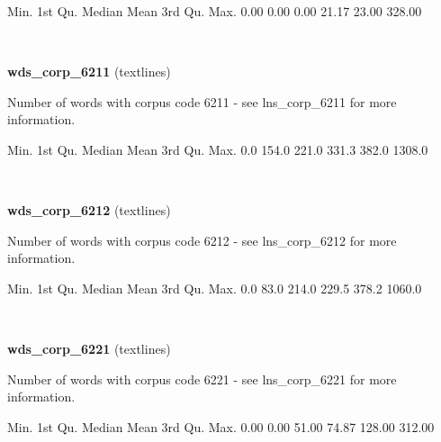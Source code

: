 \documentclass[]{article}
\newenvironment{Shaded}{\begin{snugshade}}{\end{snugshade}}
\newcommand{\FloatTok}[1]{\textcolor[rgb]{0.00,0.00,0.81}{{#1}}}
\newcommand{\NormalTok}[1]{{#1}}
\begin{document}
\begin{Shaded}
\begin{Highlighting}[]
   \NormalTok{Min. 1st Qu.  Median    Mean 3rd Qu.    Max. }
   \FloatTok{0.00}    \FloatTok{0.00}    \FloatTok{0.00}   \FloatTok{21.17}   \FloatTok{23.00}  \FloatTok{328.00} 
\end{Highlighting}
\end{Shaded}

~

\vspace{1em}

\textbf{wds\_corp\_6211} (textlines)

Number of words with corpus code 6211 - see lns\_corp\_6211 for more
information.

\begin{Shaded}
\begin{Highlighting}[]
   \NormalTok{Min. 1st Qu.  Median    Mean 3rd Qu.    Max. }
    \FloatTok{0.0}   \FloatTok{154.0}   \FloatTok{221.0}   \FloatTok{331.3}   \FloatTok{382.0}  \FloatTok{1308.0} 
\end{Highlighting}
\end{Shaded}

~

\vspace{1em}

\textbf{wds\_corp\_6212} (textlines)

Number of words with corpus code 6212 - see lns\_corp\_6212 for more
information.

\begin{Shaded}
\begin{Highlighting}[]
   \NormalTok{Min. 1st Qu.  Median    Mean 3rd Qu.    Max. }
    \FloatTok{0.0}    \FloatTok{83.0}   \FloatTok{214.0}   \FloatTok{229.5}   \FloatTok{378.2}  \FloatTok{1060.0} 
\end{Highlighting}
\end{Shaded}

~

\vspace{1em}

\textbf{wds\_corp\_6221} (textlines)

Number of words with corpus code 6221 - see lns\_corp\_6221 for more
information.

\begin{Shaded}
\begin{Highlighting}[]
   \NormalTok{Min. 1st Qu.  Median    Mean 3rd Qu.    Max. }
   \FloatTok{0.00}    \FloatTok{0.00}   \FloatTok{51.00}   \FloatTok{74.87}  \FloatTok{128.00}  \FloatTok{312.00} 
\end{Highlighting}
\end{Shaded}
\end{document}
